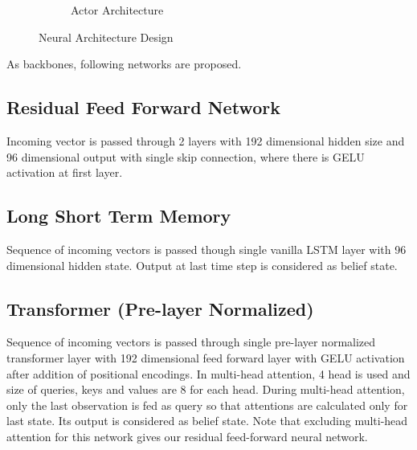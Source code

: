 \begin{figure}
\begin{subfigure}{.5\textwidth}
		\caption{Actor Architecture}
		\label{fig:actor_net}
	\end{subfigure}
	\caption{Neural Architecture Design}
	\label{fig:nets}
\end{figure}

As backbones, following networks are proposed. 

\subsection{Residual Feed Forward Network}

Incoming vector is passed through 2 layers with 192 dimensional hidden size and 96 dimensional output with single skip connection, where there is GELU activation at first layer. 

\subsection{Long Short Term Memory}

Sequence of incoming vectors is passed though single vanilla LSTM layer with 96 dimensional hidden state. 
Output at last time step is considered as belief state. 

\subsection{Transformer (Pre-layer Normalized)}

Sequence of incoming vectors is passed through single pre-layer normalized transformer layer with 192 dimensional feed forward layer with GELU activation after addition of positional encodings.
In multi-head attention, 4 head is used and size of queries, keys and values are 8 for each head.
During multi-head attention, only the last observation is fed as query so that attentions are calculated only for last state.  
Its output is considered as belief state.
Note that excluding multi-head attention for this network gives our residual feed-forward neural network.
